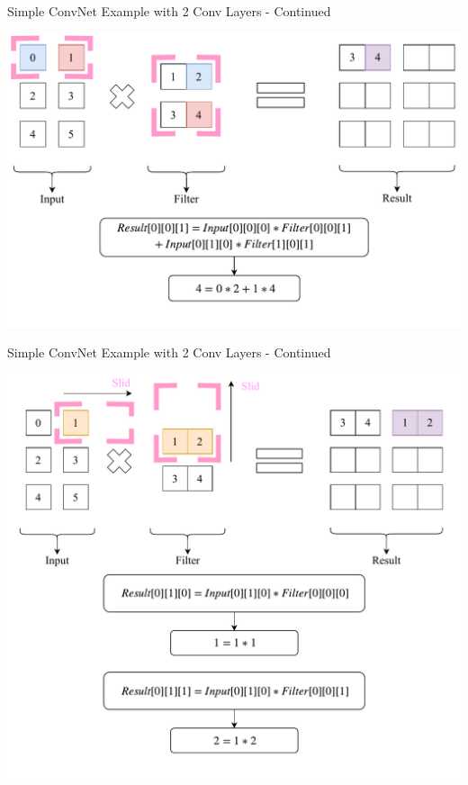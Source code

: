 \documentclass{beamer}
\begin{document}
		\begin{frame}{Simple ConvNet Example with 2 Conv Layers - Continued}
			\begin{center}
				\includegraphics[height=0.8\textheight]{firstConvSample_step2}
			\end{center}
		\end{frame}
		\begin{frame}{Simple ConvNet Example with 2 Conv Layers - Continued}
			\begin{center}
				\includegraphics[height=0.8\textheight]{firstConvSample_step3}
			\end{center}
		\end{frame}
\end{document}
